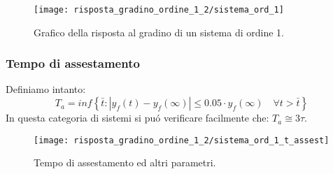 \documentclass[../main.tex]{subfiles}
\begin{document}
		\begin{figure}[H]
			\centering
			\texttt{[image: risposta\_gradino\_ordine\_1\_2/sistema\_ord\_1]}
			\caption{Grafico della risposta al gradino di un sistema di ordine 1.}
		\end{figure} 
		
	\subsubsection{Tempo di assestamento}
		Definiamo intanto:
		\[
			T_a = inf \left\lbrace \bar t : | y_f(t) - y_f(\infty) | \leq 0.05 \cdot y_f(\infty) \quad \forall t > \bar t \right\rbrace
		\]
		In questa categoria di sistemi si pu\'o verificare facilmente che: $ T_a \cong 3\tau $.
		
		\begin{figure}[H]
			\centering
			\texttt{[image: risposta\_gradino\_ordine\_1\_2/sistema\_ord\_1\_t\_assest]}
			\caption{Tempo di assestamento ed altri parametri.}
		\end{figure} 
		
\end{document}
